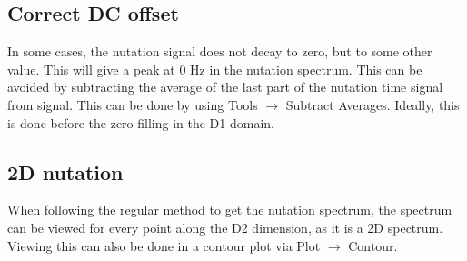 \documentclass[11pt,a4paper]{article}
\begin{document}
\subsection{Correct DC offset}
In some cases, the nutation signal does not decay to zero, but to some other value. This will give a peak at 0 Hz in the nutation spectrum. This can be avoided by subtracting the average of the last part of the nutation time signal from signal. This can be done by using Tools $\longrightarrow$ Subtract Averages. Ideally, this is done before the zero filling in the D1 domain.

\subsection{2D nutation}
When following the regular method to get the nutation spectrum, the spectrum can be viewed for every point along the D2 dimension, as it is a 2D spectrum. Viewing this can also be done in a contour plot via Plot $\longrightarrow$ Contour.
\end{document}
